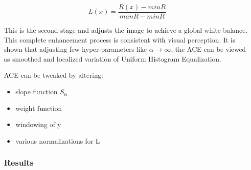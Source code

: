 \documentclass[12pt, a4paper, font = Times New Roman]{article}
\begin{document}
\begin{equation}
L(x) = \frac{R(x) - min R }{man R - min R}
\end{equation}

\par
This is the second stage and adjusts the image to achieve a global white balance. This complete enhancement process is consistent with visual perception. It is shown that adjusting few hyper-parameters like $\alpha \to \infty$, the ACE can be viewed as smoothed and localized variation of Uniform Histogram Equalization. 
\par
ACE can be tweaked by altering:
\begin{itemize}
\item slope function $S_\alpha$
\item weight function
\item windowing of y
\item various normalizations for L
\end{itemize}





\subsubsection{Results}
\end{document}
